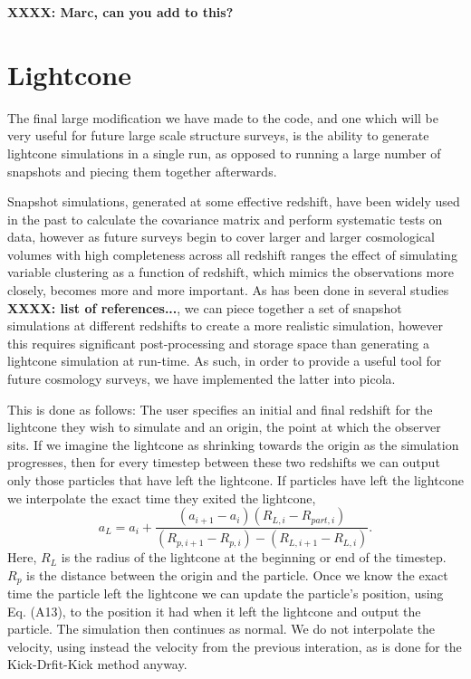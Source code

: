 \documentclass[5p,authoryear]{elsarticle}
\begin{document}
\textbf{XXXX: Marc, can you add to this?}

\section{Lightcone}
The final large modification we have made to the code, and one which will be very useful for future large scale structure surveys, is the ability to generate lightcone simulations in a single run, as opposed to running a large number of snapshots and piecing them together afterwards.

Snapshot simulations, generated at some effective redshift, have been widely used in the past to calculate the covariance matrix and perform systematic tests on data, however as future surveys begin to cover larger and larger cosmological volumes with high completeness across all redshift ranges the effect of simulating variable clustering as a function of redshift, which mimics the observations more closely, becomes more and more important. As has been done in several studies \textbf{XXXX: list of references...}, we can piece together a set of snapshot simulations at different redshifts to create a more realistic simulation, however this requires significant post-processing and storage space than generating a lightcone simulation at run-time. As such, in order to provide a useful tool for future cosmology surveys, we have implemented the latter into {\sc picola}.

This is done as follows: The user specifies an initial and final redshift for the lightcone they wish to simulate and an origin, the point at which the observer sits. If we imagine the lightcone as shrinking towards the origin as the simulation progresses, then for every timestep between these two redshifts we can output only those particles that have left the lightcone. If particles have left the lightcone we interpolate the exact time they exited the lightcone,
\begin{equation}
a_{L} = a_{i}+\frac{(a_{i+1}-a_{i})(R_{L,i}-R_{part,i})}{(R_{p,i+1}-R_{p,i})-(R_{L,i+1}-R_{L,i})}.
\end{equation}
Here, $R_{L}$ is the radius of the lightcone at the beginning or end of the timestep. $R_{p}$ is the distance between the origin and the particle. Once we know the exact time the particle left the lightcone we can update the particle's position, using Eq. (A13), to the position it had when it left the lightcone and output the particle. The simulation then continues as normal. We do not interpolate the velocity, using instead the velocity from the previous interation, as is done for the Kick-Drfit-Kick method anyway.
\end{document}
